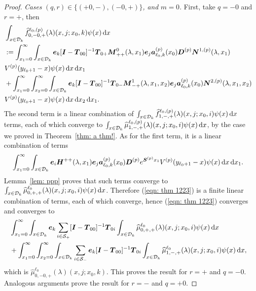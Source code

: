 \begin{proof}
	\textit{Cases \((q,r) \in \{(+0,-),(-0,+)\}\), and \(m=0\).} First, take \(q=-0\) and \(r=+\), then 
	\begin{align}
		&\int_{x\in\mathcal{D}_k}\widehat{f}_{0,-0,+}^{\ell_0,(p)}(\lambda)(x,j;x_0,k)\psi(x)\, \mathrm{d} x \nonumber 
		\\&:=\int_{x_1=0}^\infty \int_{x\in\mathcal{D}_k} \boldsymbol e_k [\boldsymbol I - \boldsymbol T_{00}]^{-1}\boldsymbol T_{0+} \boldsymbol M^0_{++}(\lambda,x_1)\boldsymbol e_j \nonumber
		\boldsymbol a_{\ell_0,k}^{(p)}(x_0) \boldsymbol D^{(p)} \boldsymbol N^{1,(p)}(\lambda,x_1) 
		\\& V^{(p)}(y_{\ell_0+1}-x)\psi(x)\, \mathrm{d} x\, \mathrm{d} x_{1}  \nonumber
		\\& + \int_{x_1=0}^\infty\int_{x_2=0}^\infty \int_{x\in\mathcal{D}_k}  \boldsymbol e_k [\boldsymbol I - \boldsymbol T_{00}]^{-1}\boldsymbol T_{0-} \boldsymbol M^1_{-+}(\lambda,x_1,x_{2})\boldsymbol e_j \nonumber
		\boldsymbol a_{\ell_0,k}^{(p)}(x_0)\boldsymbol N^{2,(p)}(\lambda,x_1,x_{2}) 
		\\& V^{(p)}(y_{\ell_0+1}-x)\psi(x)\, \mathrm{d} x\, \mathrm{d} x_{2} \, \mathrm{d} x_1. \label{eqn: thm 1223}
	\end{align}
	The second term is a linear combination of \(\int_{x\in\mathcal{D}_k}\widehat{f}_{1,-,+}^{\ell_0,(p)}(\lambda)(x,j;x_0,i) \psi(x)\, \mathrm{d} x\) terms, each of which converge to \(\int_{x\in\mathcal{D}_k}\widehat{\mu}_{1,-,+}^{\ell_0,(p)}(\lambda)(x,j;x_0,i) \psi(x)\, \mathrm{d} x\), by the case we proved in Theorem~\ref{thm: a thm!}. As for the first term, it is a linear combination of terms
	\[\int_{x_1=0}^\infty \int_{x\in\mathcal{D}_k} \boldsymbol e_i \boldsymbol H^{++}(\lambda,x_1)\boldsymbol e_j \nonumber
	\boldsymbol a_{\ell_0,k}^{(p)}(x_0) \boldsymbol D^{(p)} e^{\boldsymbol S^{(p)}x_1} 
	V^{(p)}(y_{\ell_0+1}-x)\psi(x)\, \mathrm{d} x\, \mathrm{d} x_{1}.\]
	Lemma~\ref{lem: ppp} proves that such terms converge to \(\int_{x\in\mathcal{D}_k}\widehat{\mu}_{0,+,+}^{\ell_0}(\lambda)(x,j;x_0,i) \psi(x)\, \mathrm{d} x\). Therefore (\ref{eqn: thm 1223}) is a finite linear combination of terms, each of which converge, hence (\ref{eqn: thm 1223}) converges and converges to 
	\begin{align}
		&\int_{x_1=0}^\infty \int_{x\in\mathcal{D}_k} \boldsymbol e_k \sum_{i\in\mathcal{S}_+} [\boldsymbol I - \boldsymbol T_{00}]^{-1}\boldsymbol T_{0i}\int_{x\in\mathcal{D}_k}\widehat{\mu}_{0,+,+}^{\ell_0}(\lambda)(x,j;x_0,i) \psi(x)\, \mathrm{d} x \nonumber
		\\& + \int_{x_1=0}^\infty\int_{x_2=0}^\infty \int_{x\in\mathcal{D}_k} \sum_{i\in\mathcal{S}_-}\boldsymbol e_k [\boldsymbol I - \boldsymbol T_{00}]^{-1}\boldsymbol T_{0i}\int_{x\in\mathcal{D}_k}\widehat{\mu}_{1,-,+}^{\ell_0}(\lambda)(x,j;x_0,i) \psi(x)\, \mathrm{d} x, \label{eqn: thm 1223B}
	\end{align}
	which is \(\widehat{\mu}_{0,-0,+}^{\ell_0}(\lambda)(x,j;x_0,k)\). This proves the result for \(r=+\) and \(q=-0\). Analogous arguments prove the result for \(r=-\) and \(q=+0\).


\end{proof}
